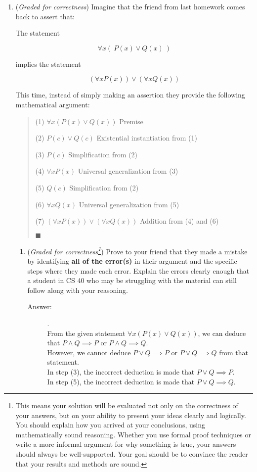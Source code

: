 \documentclass[12pt, oneside]{article}
\begin{document}
\begin{enumerate}
\item({\it Graded for correctness}) Imagine that the friend from last homework comes back to assert that:

The statement

\[
\forall x (~P(x) \lor  Q(x)~) 
\]

implies the statement

\[
(\forall x P(x)) \lor (\forall x Q(x)) 
\]

This time, instead of simply making an assertion they provide the following mathematical argument:
\begin{quote}

(1) $\forall x(P(x) \lor Q(x))$ \hfill{Premise}

(2) $P(c) \lor Q(c)$
\hfill{Existential instantiation from (1)}

(3) $P(c)$ \hfill{Simplification from (2)}

(4) $\forall x P(x)$ \hfill{Universal generalization from (3)}

(5) $Q(c)$ \hfill{Simplification from (2)}

(6) $\forall xQ(x)$
\hfill{Universal generalization from (5)}

(7) $(\forall xP(x)) \lor (\forall xQ(x))$
\hfill{Addition from (4) and (6)}

\hfill{$\blacksquare$}

\end{quote}

\begin{enumerate}

\item ({\it Graded for correctness\footnote{This means your solution will be
evaluated not only on the correctness of your answers, but on your ability to 
present your ideas clearly and logically. You should explain how you arrived at your conclusions, using 
mathematically sound reasoning. Whether you use formal proof techniques or write a more informal argument for why 
something is true, your answers should always be well-supported. Your goal should be to convince the reader that 
your results and methods are sound.}}) Prove to your friend that they made a mistake by identifying \textbf{all of the error(s)} in their argument and the specific steps where they made each error. Explain the errors clearly enough that a student in CS 40 who may be 
struggling with the material can still follow along with your reasoning.
\begin{description}
    \item[Answer:] .\\
    From the given statement $\forall x (P(x) \lor Q(x))$, we can deduce that $P \land Q \implies P$ or $P \land Q \implies Q$.\\
    However, we cannot deduce $P \lor Q \implies P$ or $P \lor Q \implies Q$ from that statement.\\
    In step (3), the incorrect deduction is made that $P \lor Q \implies P$.\\
    In step (5), the incorrect deduction is made that $P \lor Q \implies Q$.\\


\end{description}
\end{enumerate}
\end{enumerate}
\end{document}
